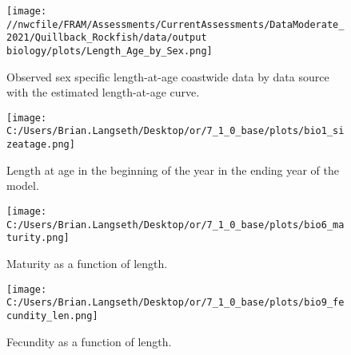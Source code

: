\documentclass[11pt,
  english,
  a4paper,
]{article}
\begin{document}
\tagmcend\tagstructend


\begin{figure}
\centering
\texttt{[image: //nwcfile/FRAM/Assessments/CurrentAssessments/DataModerate\_2021/Quillback\_Rockfish/data/output biology/plots/Length\_Age\_by\_Sex.png]}
\caption{Observed sex specific length-at-age coastwide data by data source with the estimated length-at-age curve.\label{fig:len-age-data}}
\end{figure}

\tagmcend\tagstructend


\begin{figure}
\centering
\texttt{[image: C:/Users/Brian.Langseth/Desktop/or/7\_1\_0\_base/plots/bio1\_sizeatage.png]}
\caption{Length at age in the beginning of the year in the ending year of the model.\label{fig:len-age-ss}}
\end{figure}

\tagmcend\tagstructend


\begin{figure}
\centering
\texttt{[image: C:/Users/Brian.Langseth/Desktop/or/7\_1\_0\_base/plots/bio6\_maturity.png]}
\caption{Maturity as a function of length.\label{fig:maturity}}
\end{figure}

\tagmcend\tagstructend


\begin{figure}
\centering
\texttt{[image: C:/Users/Brian.Langseth/Desktop/or/7\_1\_0\_base/plots/bio9\_fecundity\_len.png]}
\caption{Fecundity as a function of length.\label{fig:fecundity}}
\end{figure}

\tagmcend\tagstructend

\end{document}
